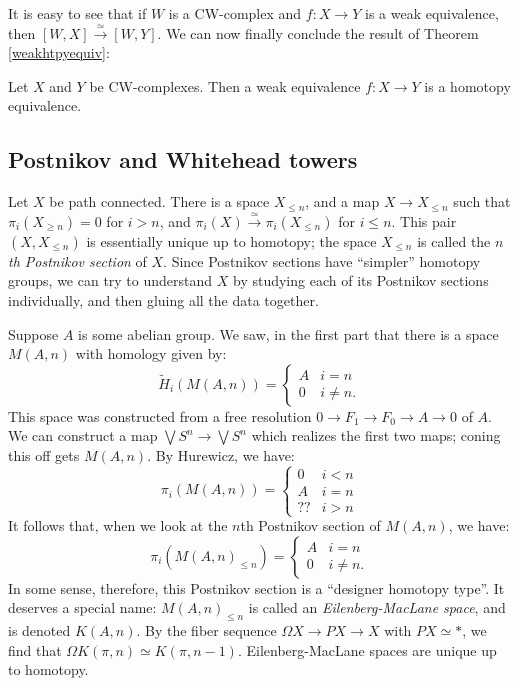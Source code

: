 It is easy to see that if $W$ is a CW-complex and $f:X\to Y$ is a weak equivalence, then $[W,X]\xrightarrow{\simeq}[W,Y]$. 
We can now finally conclude the result of Theorem \ref{weakhtpyequiv}:
\begin{corollary}
    Let $X$ and $Y$ be CW-complexes.
    Then a weak equivalence $f:X\to Y$ is a homotopy equivalence.
\end{corollary}
\subsection{Postnikov and Whitehead towers}
Let $X$ be path connected.
There is a space $X_{\leq n}$, and a map $X\to X_{\leq n}$ such that $\pi_i(X_{\geq n}) = 0$ for $i>n$,
and $\pi_i(X)\xrightarrow{\simeq}\pi_i(X_{\leq n})$ for $i\leq n$.
This pair $(X,X_{\leq n})$ is essentially unique up to homotopy; the space $X_{\leq n}$ is called 
the \emph{$n$th Postnikov section} of $X$.
Since Postnikov sections have ``simpler'' homotopy groups, we can try to understand $X$ by studying each of its Postnikov
sections individually, and then gluing all the data together.

Suppose $A$ is some abelian group.
We saw, in the first part that there is a space $M(A,n)$ with homology given by:
\begin{equation*}
    \widetilde{H}_i(M(A,n)) = \begin{cases}
	A & i = n\\
	0 & i\neq n.
    \end{cases}
\end{equation*}
This space was constructed from a free resolution $0\to F_1\to F_0\to A\to 0$ of $A$.
We can construct a map $\bigvee S^n\to \bigvee S^n$ which realizes the first two maps; coning this off gets $M(A,n)$.
By Hurewicz, we have:
\begin{equation*}
    \pi_i(M(A,n)) = \begin{cases}
	0 & i<n\\
	A & i = n\\
	?? & i>n
    \end{cases}
\end{equation*}
It follows that, when we look at the $n$th Postnikov section of $M(A,n)$, we have:
\begin{equation*}
    \pi_i(M(A,n)_{\leq n}) = \begin{cases}
	A & i = n\\
	0 & i\neq n.
    \end{cases}
\end{equation*}
In some sense, therefore, this Postnikov section is a ``designer homotopy type''.
It deserves a special name: $M(A,n)_{\leq n}$ is called an \emph{Eilenberg-MacLane space}, and is denoted $K(A,n)$.
By the fiber sequence $\Omega X\to PX\to X$ with $PX\simeq \ast$, we find that $\Omega K(\pi,n)\simeq K(\pi,n-1)$.
Eilenberg-MacLane spaces are unique up to homotopy.

